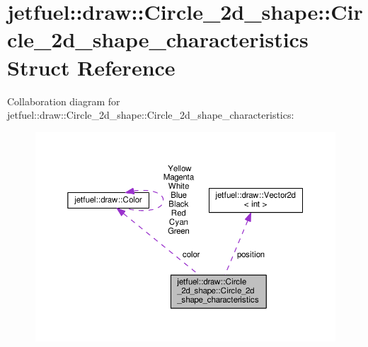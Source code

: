 \hypertarget{structjetfuel_1_1draw_1_1Circle__2d__shape_1_1Circle__2d__shape__characteristics}{}\section{jetfuel\+:\+:draw\+:\+:Circle\+\_\+2d\+\_\+shape\+:\+:Circle\+\_\+2d\+\_\+shape\+\_\+characteristics Struct Reference}
\label{structjetfuel_1_1draw_1_1Circle__2d__shape_1_1Circle__2d__shape__characteristics}


Collaboration diagram for jetfuel\+:\+:draw\+:\+:Circle\+\_\+2d\+\_\+shape\+:\+:Circle\+\_\+2d\+\_\+shape\+\_\+characteristics\+:
\nopagebreak
\begin{figure}[H]
\begin{center}
\leavevmode
\includegraphics[width=350pt]{structjetfuel_1_1draw_1_1Circle__2d__shape_1_1Circle__2d__shape__characteristics__coll__graph}
\end{center}
\end{figure}
